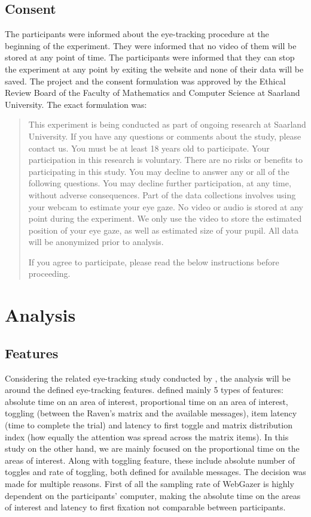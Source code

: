 \subsection{Consent}
The participants were informed about the eye-tracking procedure at the beginning of the experiment. They were informed that no video of them will be stored at any point of time. The participants were informed that they can stop the experiment at any point by exiting the website and none of their data will be saved. The project and the consent formulation was approved by the Ethical Review Board of the Faculty of Mathematics and Computer Science at Saarland University. The exact formulation was: 

\begin{quote}
    This experiment is being conducted as part of ongoing research at Saarland University. If you have any questions or comments about the study, please contact us. You must be at least 18 years old to participate. Your participation in this research is voluntary. There are no risks or benefits to participating in this study. You may decline to answer any or all of the following questions. You may decline further participation, at any time, without adverse consequences. Part of the data collections involves using your webcam to estimate your eye gaze. No video or audio is stored at any point during the experiment. We only use the video to store the estimated position of your eye gaze, as well as estimated size of your pupil. All data will be anonymized prior to analysis. 

    If you agree to participate, please read the below instructions before proceeding.
\end{quote}


\section{Analysis}
\label{sec:analysis}

\subsection{Features}
\label{sec:analysis:features}
Considering the related eye-tracking study conducted by \cite{Vigneau_2006}, the analysis will be around the defined eye-tracking features. \cite{Vigneau_2006} defined mainly 5 types of features: absolute time on an area of interest, proportional time on an area of interest, toggling (between the Raven's matrix and the available messages), item latency (time to complete the trial) and latency to first toggle and matrix distribution index (how equally the attention was spread across the matrix items). In this study on the other hand, we are mainly focused on the proportional time on the areas of interest. Along with toggling feature, these include absolute number of toggles and rate of toggling, both defined for available messages. The decision was made for multiple reasons. First of all the sampling rate of WebGazer is highly dependent on the participants' computer, making the absolute time on the areas of interest and latency to first fixation not comparable between participants. 

